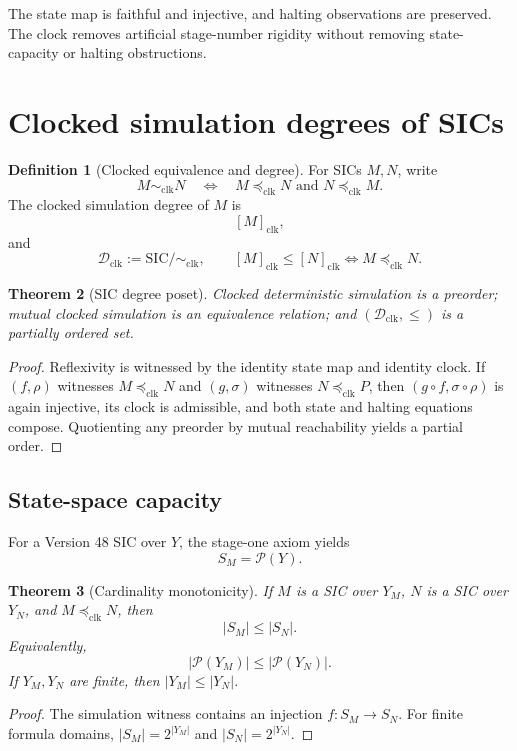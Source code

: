\documentclass[11pt]{article}
\newtheorem{theorem}{Theorem}[section]
\theoremstyle{definition}
\newtheorem{definition}[theorem]{Definition}
\newcommand{\SIC}{\mathrm{SIC}}
\newcommand{\Pow}{\mathcal{P}}
\newcommand{\Dclk}{\mathcal{D}_{\mathrm{clk}}}
\newcommand{\simclk}{\sim_{\mathrm{clk}}}
\newcommand{\preclk}{\preceq_{\mathrm{clk}}}
\begin{document}
The state map is faithful and injective, and halting observations are preserved. The clock removes artificial stage-number rigidity without removing state-capacity or halting obstructions.

\section{Clocked simulation degrees of SICs}

\begin{definition}[Clocked equivalence and degree]
For SICs $M,N$, write
\[
M\simclk N
\quad\Longleftrightarrow\quad
M\preclk N\text{ and }N\preclk M.
\]
The clocked simulation degree of $M$ is
\[
[M]_{\mathrm{clk}},
\]
and
\[
\Dclk:=\SIC/\!\simclk,
\qquad
[M]_{\mathrm{clk}}\le [N]_{\mathrm{clk}}
\Longleftrightarrow M\preclk N.
\]
\end{definition}

\begin{theorem}[SIC degree poset]
Clocked deterministic simulation is a preorder; mutual clocked simulation is an equivalence relation; and $(\Dclk,\le)$ is a partially ordered set.
\end{theorem}

\begin{proof}
Reflexivity is witnessed by the identity state map and identity clock. If $(f,\rho)$ witnesses $M\preclk N$ and $(g,\sigma)$ witnesses $N\preclk P$, then $(g\circ f,\sigma\circ\rho)$ is again injective, its clock is admissible, and both state and halting equations compose. Quotienting any preorder by mutual reachability yields a partial order.
\end{proof}

\subsection{State-space capacity}
For a Version 48 SIC over $Y$, the stage-one axiom yields
\[
S_M=\Pow(Y).
\]

\begin{theorem}[Cardinality monotonicity]\label{thm:cardinality}
If $M$ is a SIC over $Y_M$, $N$ is a SIC over $Y_N$, and $M\preclk N$, then
\[
|S_M|\le |S_N|.
\]
Equivalently,
\[
|\Pow(Y_M)|\le |\Pow(Y_N)|.
\]
If $Y_M,Y_N$ are finite, then $|Y_M|\le |Y_N|$.
\end{theorem}

\begin{proof}
The simulation witness contains an injection $f:S_M\to S_N$. For finite formula domains, $|S_M|=2^{|Y_M|}$ and $|S_N|=2^{|Y_N|}$.
\end{proof}
\end{document}

